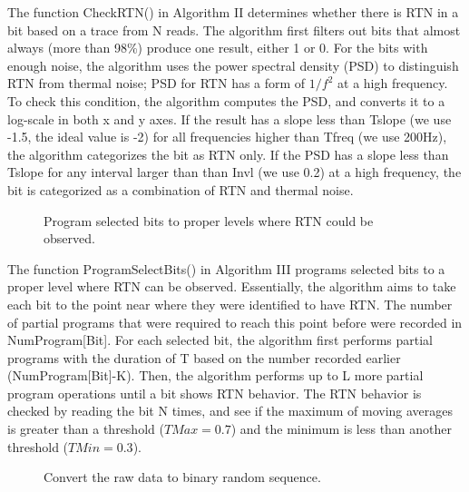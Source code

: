 The function CheckRTN() in Algorithm II determines whether there is RTN in a bit based on a trace from N reads. The algorithm first filters out bits that almost always (more than 98\%) produce one result, either 1 or 0. For the bits with enough noise, the algorithm uses the power spectral density (PSD) to distinguish RTN from thermal noise; PSD for RTN has a form of $1/{f}^2$ at a high frequency. To check this condition, the algorithm computes the PSD, and converts it to a log-scale in both x and y axes. If the result has a slope less than Tslope (we use -1.5, the ideal value is -2) for all frequencies higher than Tfreq (we use 200Hz), the algorithm categorizes the bit as RTN only. If the PSD has a slope less than Tslope for any interval larger than than Invl (we use 0.2) at a high frequency, the bit is categorized as a combination of RTN and thermal noise.

\begin{figure} 
\begin{center} 
 
\caption{Program selected bits to proper levels where RTN could be observed.}
\label{fig:prg_rtn} 
\vspace{-0.25in}
\end{center} 
\end{figure}

The function ProgramSelectBits() in Algorithm III programs selected bits to a proper level where RTN can be observed. Essentially, the algorithm aims to take each bit to the point near where they were identified to have RTN. The number of partial programs that were required to reach this point before were recorded in NumProgram[Bit]. For each selected bit, the algorithm first performs partial programs with the duration of T based on the number recorded earlier (NumProgram[Bit]-K). Then, the algorithm performs up to L more partial program operations until a bit shows RTN behavior. The RTN behavior is checked by reading the bit N times, and see if the maximum of moving averages is greater than a threshold ($TMax = 0.7$) and the minimum is less than another threshold ($TMin = 0.3$). 

\begin{figure} 
\begin{center} 
 
\caption{Convert the raw data to binary random sequence.}
\label{fig:to_bin_seq} 
\vspace{-0.25in}
\end{center} 
\end{figure}

